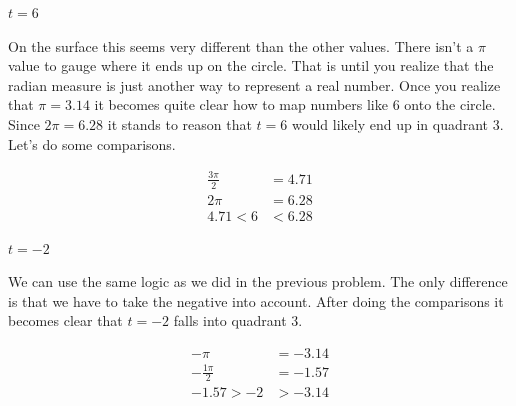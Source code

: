 \documentclass[10pt,letterpaper]{amspset}
\begin{document}
\begin{problem} [47.]
$t = 6$
\end{problem}

\begin{solution}
On the surface this seems very different than the other values. There isn't a $\pi$ value to gauge where it ends up on the circle. That is until you realize that the radian measure is just another way to represent a real number. Once you realize that $\pi = 3.14$ it becomes quite clear how to map numbers like $6$ onto the circle. Since $2\pi = 6.28$ it stands to reason that $t=6$ would likely end up in quadrant 3. Let's do some comparisons.

\begin{align}
    \frac{3\pi}{2} &= 4.71 \\
    2\pi &= 6.28 \\
    4.71 < 6 &< 6.28
\end{align} 

\begin{center}
\end{center}
\end{solution}

\begin{problem} [48.]
$t = -2$
\end{problem}

\begin{solution}
We can use the same logic as we did in the previous problem. The only difference is that we have to take the negative into account. After doing the comparisons it becomes clear that $t = -2$ falls into quadrant 3. 

\begin{align}
    -\pi &= -3.14 \\
    -\frac{1\pi}{2} &= -1.57 \\
    -1.57 > -2 &> -3.14
\end{align} 

\begin{center}
\end{center}

\end{solution}
\end{document}
